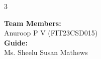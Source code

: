 \documentclass[a4paper,landscape,10pt]{article}
\begin{document}
\begin{multicols}{3}
\vspace{0.5cm}
\begin{flushright}
\textbf{Team Members:} \\
Anuroop P V (FIT23CSD015) \\[0.3cm]

\textbf{Guide:} \\
Ms. Sheelu Susan Mathews
\end{flushright}

\end{multicols}
\end{document}
